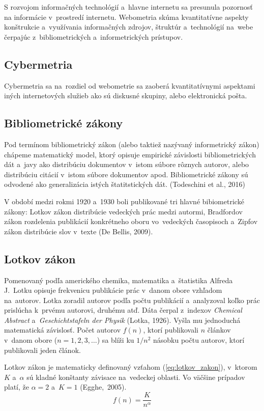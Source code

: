 S rozvojom informačných technológií a~hlavne internetu sa presunula pozornosť na
informácie v~prostredí internetu. Webometria skúma kvantitatívne aspekty
konštrukcie a~využívania informačných zdrojov, štruktúr a~technológií na~webe
čerpajúc z~bibliometrických a~informetrických prístupov. 


\subsection{Cybermetria}

Cybermetria sa na~rozdiel od webometrie sa zaoberá kvantitatívnymi aspektami
iných internetových služieb ako sú diskusné skupiny, alebo elektronická pošta.


\subsection{Bibliometrické zákony}

Pod termínom bibliometrický zákon (alebo taktiež nazývaný informetrický zákon)
chápeme matematický model, ktorý opisuje empirické závislosti bibliometrických
dát a~javy ako distribúciu dokumentov v~istom súbore rôznych autorov, alebo
distribúciu citácií v~istom súbore dokumentov apod. Bibliometrické zákony sú
odvodené ako generalizácia istých štatitstických dát. (Todeschini et al., 2016)

V období medzi rokmi 1920 a~1930 boli publikované tri hlavné bibiometrické
zákony: Lotkov zákon distribúcie vedeckých prác medzi autormi, Bradfordov zákon
rozdelenia publikácií konkrétneho oboru vo~vedeckých časopisoch a~Zipfov zákon
distribúcie slov v~texte (De Bellis, 2009).


\subsection{Lotkov zákon}

Pomenovaný podľa amerického chemika, matematika a~štatistika Alfreda J.~Lotku
opisuje frekvenicu publikácie prác v~danom obore vzhľadom na~autorov. Lotka
zoradil autorov podľa počtu publikácií a~analyzoval koľko prác prislúcha
k~prvému autorovi, druhému atď. Dáta čerpal z~indexov {\em Chemical Abstract}
a~{\em Geschichtstafeln der Physik} (Lotka, 1926). Vyšla mu jednoduchá
matematická závislosť. Počet autorov $f(n)$, ktorí publikovali $n$ článkov
v~danom obore ($n = 1, 2, 3, \dots$) sa blíži ku $1/n^2$ násobku počtu autorov,
ktorí publikovali jeden článok.

Lotkov zákon je matematicky definovaný vzťahom (\ref{eq:lotkov_zakon}), v~ktorom
$K$ a~$\alpha$ sú kladné konštanty závisace na~vedeckej oblasti. Vo väčšine
prípadov platí, že $\alpha = 2$ a~$K = 1$ (Egghe,~2005).
\begin{equation}
\label{eq:lotkov_zakon}
f(n) = \frac{K}{n^\alpha}
\end{equation}

